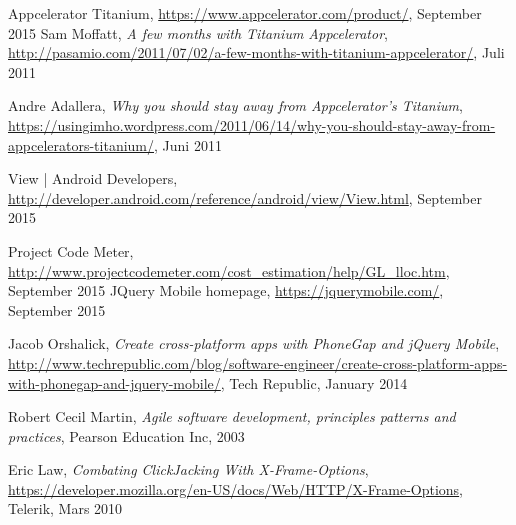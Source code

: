 \begin{thebibliography}{9}
	Appcelerator Titanium,
	\url{https://www.appcelerator.com/product/},
	September 2015
	Sam Moffatt,
	\emph{A few months with Titanium Appcelerator},
	\url{http://pasamio.com/2011/07/02/a-few-months-with-titanium-appcelerator/},
	Juli 2011

	Andre Adallera,
\emph{Why you should stay away from Appcelerator’s Titanium},
\url{https://usingimho.wordpress.com/2011/06/14/why-you-should-stay-away-from-appcelerators-titanium/},
	Juni 2011

	View | Android Developers,
	\url{http://developer.android.com/reference/android/view/View.html},
	September 2015	
	
	Project Code Meter, 
	\url{http://www.projectcodemeter.com/cost_estimation/help/GL_lloc.htm},
	September 2015
	JQuery Mobile homepage,
	\url{https://jquerymobile.com/},
	September 2015

Jacob Orshalick,
\emph{Create cross-platform apps with PhoneGap and jQuery Mobile},
\url{http://www.techrepublic.com/blog/software-engineer/create-cross-platform-apps-with-phonegap-and-jquery-mobile/},
	Tech Republic,
	January 2014

	Robert Cecil Martin,
	\emph{Agile software development, principles patterns and practices},
	Pearson Education Inc,
	2003	

	Eric Law,
	\emph{Combating ClickJacking With X-Frame-Options},
	\url{https://developer.mozilla.org/en-US/docs/Web/HTTP/X-Frame-Options},
	Telerik,
	Mars 2010
\end{thebibliography}